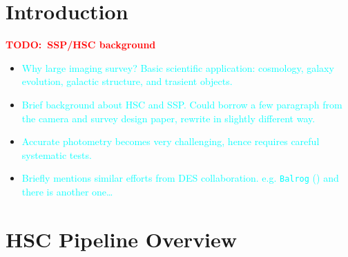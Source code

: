 \documentclass[preprint]{aastex}
\newcommand{\todo}[1]{\textcolor{red}{\textbf{TODO:~#1}}}
\newcommand{\plan}[1]{\textcolor{cyan}{#1}}
\begin{document}
\maketitle


\section{Introduction}

    \todo{SSP/HSC background}
    \begin{itemize}
        \item \plan{Why large imaging survey? Basic scientific application: cosmology, 
                    galaxy evolution, galactic structure, and trasient objects.} 
        \item \plan{Brief background about HSC and SSP. 
                    Could borrow a few paragraph from the camera and survey design paper, 
                    rewrite in slightly different way.}
        \item \plan{Accurate photometry becomes very challenging, hence requires careful 
                    systematic tests.}
        \item \plan{Briefly mentions similar efforts from DES collaboration. e.g. 
                    \texttt{Balrog} (\citep{Suchyta2016}) and there is another one\ldots}
    \end{itemize}


\section{HSC Pipeline Overview}
\end{document}
